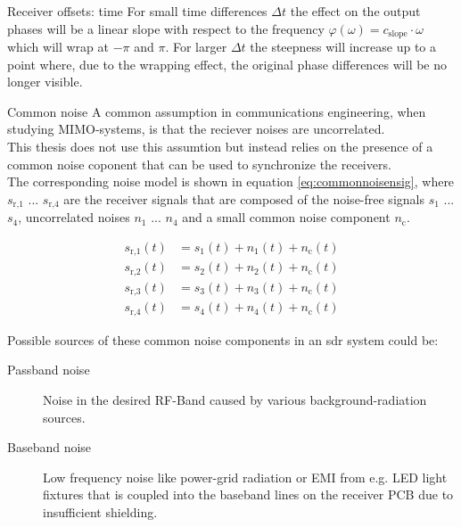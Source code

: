 \begin{subchapter}{Receiver offsets: time}
  For small time differences $\Delta t$ the effect on the output
  phases will be a linear slope with respect to the frequency
  $\varphi(\omega)= c_\text{slope} \cdot \omega$ which will wrap
  at $-\pi$ and $\pi$.
  For larger $\Delta t$ the steepness will increase up to a
  point where, due to the wrapping effect, the original phase
  differences will be no longer visible.
\end{subchapter}

\begin{subchapter}{Common noise}
  A common assumption in communications engineering, when
  studying MIMO-systems, is that the reciever noises are
  uncorrelated. \\

  This thesis does not use this assumtion but instead
  relies on the presence of a common noise coponent
  that can be used to synchronize the receivers. \\

  The corresponding noise model is shown in equation
  \ref{eq:commonnoisensig}, where $s_\text{r,1}$ ... $s_\text{r,4}$
  are the receiver signals that are composed of
  the noise-free signals $s_\text{1}$ ... $s_\text{4}$,
  uncorrelated noises $n_\text{1}$ ... $n_\text{4}$
  and a small common noise component $n_\text{c}$.

  \begin{align}
    \label{eq:commonnoisensig}
    s_\text{r,1}(t) &= s_\text{1}(t) + n_\text{1}(t) + n_\text{c}(t) \\
    s_\text{r,2}(t) &= s_\text{2}(t) + n_\text{2}(t) + n_\text{c}(t) \nonumber \\
    s_\text{r,3}(t) &= s_\text{3}(t) + n_\text{3}(t) + n_\text{c}(t) \nonumber \\
    s_\text{r,4}(t) &= s_\text{4}(t) + n_\text{4}(t) + n_\text{c}(t) \nonumber
  \end{align}

  Possible sources of these common noise components in
  an \gls{sdr} system could be:

  \begin{description}
    \item[Passband noise]
      Noise in the desired RF-Band caused by various background-radiation
      sources.

    \item[Baseband noise]
      Low frequency noise like power-grid radiation or EMI from e.g.
      LED light fixtures that is coupled into the baseband lines on
      the receiver PCB due to insufficient shielding.


\end{description}
\end{subchapter}
